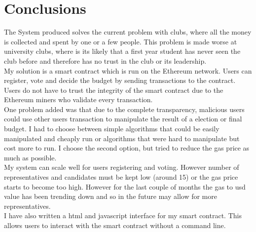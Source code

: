 \chapter{Conclusions} \label{Chapter: Conclusions}
The System produced solves the current problem with clubs, where all the money is collected and spent by one or a few people. This problem is made worse at university clubs, where is its likely that a first year student has never seen the club before and therefore has no trust in the club or its leadership.  \\
My solution is a smart contract which is run on the Ethereum network. Users can register, vote and decide the budget by sending transactions to the contract. Users do not have to trust the integrity of the smart contract due to the Ethereum miners who validate every transaction. \\
One problem added was that due to the complete transparency, malicious users could use other users transaction to manipulate the result of a election or final budget. I had to choose between simple algorithms that could be easily manipulated and cheaply run or algorithms that were hard to manipulate but cost more to run. I choose the second option, but tried to reduce the gas price as much as possible. \\
My system can scale well for users registering and voting. However number of representatives and candidates must be kept low (around 15) or the gas price starts to become too high. However for the last couple of months the gas to usd value has been trending down and so in the future may allow for more representatives. \\
I have also written a html and javascript interface for my smart contract. This allows users to interact with the smart contract without a command line. 

